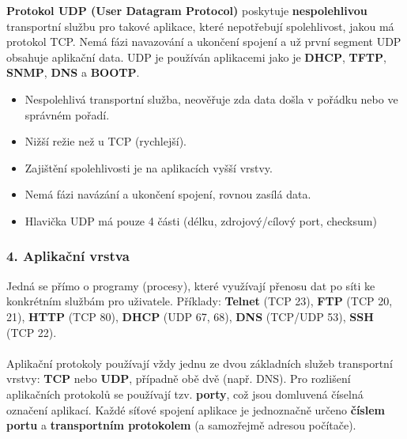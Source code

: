\textbf{Protokol UDP (User Datagram Protocol)} poskytuje \textbf{nespolehlivou} transportní službu pro takové aplikace, které nepotřebují spolehlivost, jakou má protokol TCP. Nemá fázi navazování a ukončení spojení a už první segment UDP obsahuje aplikační data. UDP je používán aplikacemi jako je \textbf{DHCP}, \textbf{TFTP}, \textbf{SNMP}, \textbf{DNS} a \textbf{BOOTP}.
\begin{itemize}
	\item Nespolehlivá transportní služba, neověřuje zda data došla v pořádku nebo ve správném pořadí.
	\item Nižší režie než u TCP (rychlejší).
	\item Zajištění spolehlivosti je na aplikacích vyšší vrstvy.
	\item Nemá fázi navázání a ukončení spojení, rovnou zasílá data.
	\item Hlavička UDP má pouze 4 části (délku, zdrojový/cílový port, checksum)
\end{itemize}

\noindent{}

\subsubsection*{4. Aplikační vrstva}
Jedná se přímo o programy (procesy), které využívají přenosu dat po síti ke konkrétním službám pro uživatele. Příklady: \textbf{Telnet} (TCP 23), \textbf{FTP} (TCP 20, 21), \textbf{HTTP} (TCP 80), \textbf{DHCP} (UDP 67, 68), \textbf{DNS} (TCP/UDP 53), \textbf{SSH} (TCP 22).
\\\\
Aplikační protokoly používají vždy jednu ze dvou základních služeb transportní vrstvy: \textbf{TCP} nebo \textbf{UDP}, případně obě dvě (např. DNS). Pro rozlišení aplikačních protokolů se používají tzv. \textbf{porty}, což jsou domluvená číselná označení aplikací. Každé síťové spojení aplikace je jednoznačně určeno \textbf{číslem portu} a \textbf{transportním protokolem} (a samozřejmě adresou počítače).

